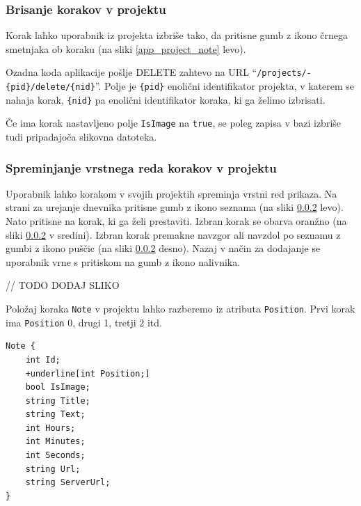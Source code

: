\documentclass[a4paper, 12pt]{book}
\begin{document}
\subsubsection{Brisanje korakov v projektu}

Korak lahko uporabnik iz projekta izbriše tako, da pritisne gumb z ikono črnega smetnjaka ob koraku (na sliki \ref{app_project_note} levo).

Ozadna koda aplikacije pošlje DELETE zahtevo na URL \enquote{\texttt{/projects/-\\\{pid\}/delete/\{nid\}}}.
Polje je \texttt{\{pid\}} enolični identifikator projekta, v katerem se nahaja korak, \texttt{\{nid\}} pa enolični identifikator koraka, ki ga želimo izbrisati.

Če ima korak nastavljeno polje \texttt{IsImage} na \texttt{true}, se poleg zapisa v bazi izbriše tudi pripadajoča slikovna datoteka.



\subsubsection{Spreminjanje vrstnega reda korakov v projektu}

Uporabnik lahko korakom v svojih projektih spreminja vrstni red prikaza.
Na strani za urejanje dnevnika pritisne gumb z ikono seznama (na sliki \ref{} levo).
Nato pritisne na korak, ki ga želi prestaviti.
Izbran korak se obarva oranžno (na sliki \ref{} v sredini).
Izbran korak premakne navzgor ali navzdol po seznamu z gumbi z ikono puščic (na sliki \ref{} desno).
Nazaj v način za dodajanje se uporabnik vrne s pritiskom na gumb z ikono nalivnika.

// TODO DODAJ SLIKO

Položaj koraka \texttt{Note} v projektu lahko razberemo iz atributa \texttt{Position}.
Prvi korak ima \texttt{Position} 0, drugi 1, tretji 2 itd.


\begin{Verbatim}[commandchars=+\[\]]
Note { 
    int Id; 
    +underline[int Position;]
    bool IsImage;  
    string Title; 
    string Text;
    int Hours; 
    int Minutes;
    int Seconds;
    string Url;
    string ServerUrl;
}
\end{Verbatim}

\end{document}
